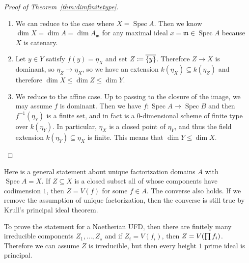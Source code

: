 \documentclass[leqno, openany]{memoir}
\theoremstyle{definition}
\theoremstyle{remark}
\theoremstyle{plain}
\theoremstyle{definition}
\theoremstyle{remark}
\newcommand{\A}{\mathbb{A}}
\newcommand{\mf}[1]{\mathfrak{#1}}
\newcommand{\ol}[1]{\overline{#1}}
\DeclareMathOperator{\Spec}{Spec}
\begin{document}
\begin{proof}[Proof of Theorem~\ref{thm:dimfinitetype}]
\begin{enumerate}
            Now we will prove that $X$ is catenary. It suffices to prove that
            if $Z \subsetneq X = \Spec A$ is a maximal proper closed
            irreducible subset, then $\dim Z = n-1$. If $X \xrightarrow{\pi}
            \A^n_k$ is the morphism obtained from Noether normalization, then
            we consider $\pi(Z) \subsetneq \A^n$. By going-down, we know
            $\pi(Z)$ is maximal, so we have now reduced to proving the
            statement for $\A^n$. But then $W = V(\mf{Q})$ for some prime ideal
            $\mf{Q}$, so let $f \in \mf{Q}$ be nonzero. If $g$ is an
            irreducible factor, then maximality of $W$ implies that $\mf{Q} =
            (g)$. But then the desired statement about dimension is simply a
            statement about the transcendance degree of $k[x_1, \ldots,
            x_n]/f$.  \item We can reduce to the case where $X = \Spec A$. Then
            we know $\dim X = \dim A = \dim A_{\mf{m}}$ for any maximal ideal
            $x = \mf{m} \in \Spec A$ because $X$ is catenary.  \item Let $y \in
            Y$ satisfy $f(y) = \eta_X$ and set $Z \coloneqq \ol{\qty{y}}$.
            Therefore $Z \to X$ is dominant, so $\eta_Z \to \eta_X$, so we have
            an extension $k(\eta_X) \subseteq k(\eta_Z)$ and therefore $\dim X
            \leq \dim Z \leq \dim Y$.  \item We reduce to the affine case. Up
            to passing to the closure of the image, we may assume $f$ is
            dominant. Then we have $f \colon \Spec A \to \Spec B$ and then
            $f^{-1}(\eta_Y)$ is a finite set, and in fact is a $0$-dimensional
            scheme of finite type over $k(\eta_Y)$. In particular, $\eta_X$ is
            a closed point of $\eta_Y$, and thus the field extension $k(\eta_Y)
            \subseteq \eta_X$ is finite. This means that $\dim Y \leq \dim X$.
            \qedhere \end{enumerate} \end{proof}

Here is a general statement about unique factorization domains $A$ with $\Spec
A = X$. If $Z \subseteq X$ is a closed subset all of whose components have
codimension $1$, then $Z = V(f)$ for some $f \in A$. The converse also holds.
If we remove the assumption of unique factorization, then the converse is still
true by Krull's principal ideal theorem. 

To prove the statement for a Noetherian UFD, then there are finitely many
irreducible components $Z_1, \ldots, Z_s$ and if $Z_i = V(f_i)$, then $Z =
V\qty(\prod f_i)$. Therefore we can assume $Z$ is irreducible, but then every
height $1$ prime ideal is principal.
\end{document}
